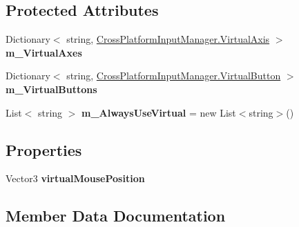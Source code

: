\subsection*{Protected Attributes}
\begin{DoxyCompactItemize}
\item 
Dictionary$<$ string, \hyperlink{class_unity_standard_assets_1_1_cross_platform_input_1_1_cross_platform_input_manager_1_1_virtual_axis}{Cross\+Platform\+Input\+Manager.\+Virtual\+Axis} $>$ {\bfseries m\+\_\+\+Virtual\+Axes}
\item 
Dictionary$<$ string, \hyperlink{class_unity_standard_assets_1_1_cross_platform_input_1_1_cross_platform_input_manager_1_1_virtual_button}{Cross\+Platform\+Input\+Manager.\+Virtual\+Button} $>$ {\bfseries m\+\_\+\+Virtual\+Buttons}
\item 
\mbox{\label{class_unity_standard_assets_1_1_cross_platform_input_1_1_virtual_input_abe7ea4edf0c3003a5a19969530cd855e}} 
List$<$ string $>$ {\bfseries m\+\_\+\+Always\+Use\+Virtual} = new List$<$string$>$()
\end{DoxyCompactItemize}
\subsection*{Properties}
\begin{DoxyCompactItemize}
\item 
\mbox{\label{class_unity_standard_assets_1_1_cross_platform_input_1_1_virtual_input_afa1db3ff31769359a2ba5de88d860e45}} 
Vector3 {\bfseries virtual\+Mouse\+Position}
\end{DoxyCompactItemize}


\subsection{Member Data Documentation}
\mbox{\label{class_unity_standard_assets_1_1_cross_platform_input_1_1_virtual_input_abb0e84e118d732a626c67adb78b26eff}} 
